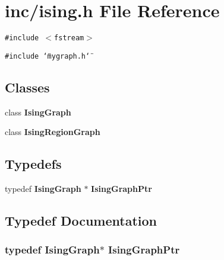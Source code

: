 \section{inc/ising.h File Reference}
\label{ising_8h}
{\tt \#include $<$fstream$>$}\par
{\tt \#include \char`\"{}mygraph.h\char`\"{}}\par
\subsection*{Classes}
\begin{CompactItemize}
\item 
class {\bf IsingGraph}
\item 
class {\bf IsingRegionGraph}
\end{CompactItemize}
\subsection*{Typedefs}
\begin{CompactItemize}
\item 
typedef {\bf IsingGraph} $\ast$ {\bf IsingGraphPtr}
\end{CompactItemize}


\subsection{Typedef Documentation}
\subsubsection{\setlength{\rightskip}{0pt plus 5cm}typedef {\bf IsingGraph}$\ast$ {\bf IsingGraphPtr}}\label{ising_8h_575691a09728b025b854c9f1de6c7b29}


